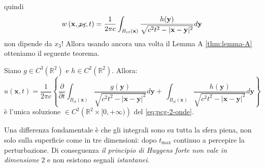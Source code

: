 \documentclass[10pt,a4paper,twoside,openright]{book}
\newcommand{\x}{\mathbf{x}}
\newcommand{\y}{\mathbf{y}}
\begin{document}
\FloatBarrier
quindi
\begin{equation*}
	w\left(\x ,\cancel{x_{3}} ,t\right) =\frac{1}{2\pi c}\int _{B_{ct}(\x)}\frac{h(\y)}{\sqrt{c^{2} t^{2} -| \x -\y| ^{2}}} d\y
\end{equation*}
non dipende da $\displaystyle x_{3}$! Allora usando ancora una volta il Lemma A \ref{thm:lemma-A} otteniamo il seguente teorema.
\begin{theorem}
	 Siano $\displaystyle g\in C^{3}\left(\mathbb{R}^{2}\right)$ e $\displaystyle h\in C^{2}\left(\mathbb{R}^{2}\right)$. Allora:
	\begin{equation}
		u(\x ,t) =\frac{1}{2\pi c}\left\{\frac{\partial }{\partial t}\int _{B_{ct}(\x)}\frac{g(\y)}{\sqrt{c^{2} t^{2} -| \x -\y| ^{2}}} d\y +\ \int _{B_{ct}(\x)}\frac{h(\y)}{\sqrt{c^{2} t^{2} -| \x -\y| ^{2}}} d\y\right\}
	\end{equation}
	è l'unica soluzione $\displaystyle \in C^{2}\left(\mathbb{R}^{2} \times [ 0,+\infty )\right)$ del \eqref{eq:pcg-2-onde}.
\end{theorem}
Una differenza fondamentale è che gli integrali sono su tutta la sfera piena, non solo sulla superficie come in tre dimensioni: dopo $\displaystyle t_{\max}$ continuo a percepire la perturbazione. Di conseguenza \textit{il principio di Huygens forte non vale in dimensione }$\displaystyle 2$ e non esistono segnali \textit{istantanei}.
\end{document}
